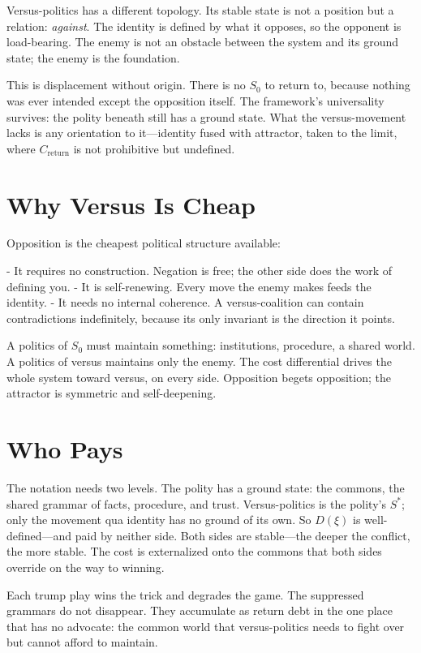 \documentclass[12pt]{article}
\begin{document}
Versus-politics has a different topology. Its stable state is not a position but a relation: \emph{against}. The identity is defined by what it opposes, so the opponent is load-bearing. The enemy is not an obstacle between the system and its ground state; the enemy is the foundation.

This is displacement without origin. There is no $S_0$ to return to, because nothing was ever intended except the opposition itself. The framework's universality survives: the polity beneath still has a ground state. What the versus-movement lacks is any orientation to it---identity fused with attractor, taken to the limit, where $C_{\text{return}}$ is not prohibitive but undefined.

\section{Why Versus Is Cheap}

Opposition is the cheapest political structure available:

- It requires no construction. Negation is free; the other side does the work of defining you.
- It is self-renewing. Every move the enemy makes feeds the identity.
- It needs no internal coherence. A versus-coalition can contain contradictions indefinitely, because its only invariant is the direction it points.

A politics of $S_0$ must maintain something: institutions, procedure, a shared world. A politics of versus maintains only the enemy. The cost differential drives the whole system toward versus, on every side. Opposition begets opposition; the attractor is symmetric and self-deepening.

\section{Who Pays}

The notation needs two levels. The polity has a ground state: the commons, the shared grammar of facts, procedure, and trust. Versus-politics is the polity's $S^*$; only the movement qua identity has no ground of its own. So $D(\xi)$ is well-defined---and paid by neither side. Both sides are stable---the deeper the conflict, the more stable. The cost is externalized onto the commons that both sides override on the way to winning.

Each trump play wins the trick and degrades the game. The suppressed grammars do not disappear. They accumulate as return debt in the one place that has no advocate: the common world that versus-politics needs to fight over but cannot afford to maintain.
\end{document}
